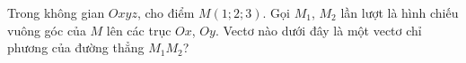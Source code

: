 \begin{ex}
Trong không gian $Oxyz$, cho điểm $M(1;2;3)$. Gọi $M_1$, $M_2$ lần lượt là hình chiếu vuông góc của $M$ lên các trục $Ox$, $Oy$. Vectơ nào dưới đây là một vectơ chỉ phương của đường thẳng $M_1M_2$?
\end{ex}
